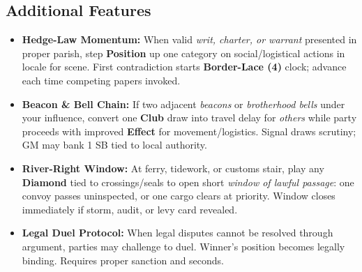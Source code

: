 \subsection*{Additional Features}
\begin{itemize}
\item \textbf{Hedge-Law Momentum:} When valid \emph{writ, charter, or warrant} presented in proper parish, step \textbf{Position} up one category on social/logistical actions in locale for scene. First contradiction starts \textbf{Border-Lace (4)} clock; advance each time competing papers invoked.
\item \textbf{Beacon \& Bell Chain:} If two adjacent \emph{beacons} or \emph{brotherhood bells} under your influence, convert one \textbf{Club} draw into travel delay for \emph{others} while party proceeds with improved \textbf{Effect} for movement/logistics. Signal draws scrutiny; GM may bank 1 SB tied to local authority.
\item \textbf{River-Right Window:} At ferry, tidework, or customs stair, play any \textbf{Diamond} tied to crossings/seals to open short \emph{window of lawful passage}: one convoy passes uninspected, or one cargo clears at priority. Window closes immediately if storm, audit, or levy card revealed.
\item \textbf{Legal Duel Protocol:} When legal disputes cannot be resolved through argument, parties may challenge to duel. Winner's position becomes legally binding. Requires proper sanction and seconds.
\end{itemize}

